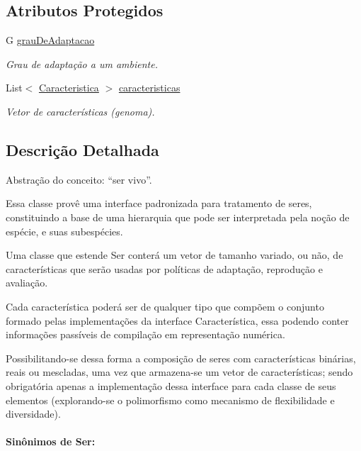 \subsection*{Atributos Protegidos}
\begin{DoxyCompactItemize}
\item 
G \hyperlink{classic_1_1populacional_1_1_ser_3_01_g_01extends_01_number_01_4_aba308e4d1affe1f03d74adb5257d269c}{grau\-De\-Adaptacao}
\begin{DoxyCompactList}\small\item\em Grau de adaptação a um ambiente. \end{DoxyCompactList}\item 
List$<$ \hyperlink{interfaceic_1_1populacional_1_1_caracteristica}{Caracteristica} $>$ \hyperlink{classic_1_1populacional_1_1_ser_3_01_g_01extends_01_number_01_4_a1d2fa894c1d58b8fc3a1aaba3548b873}{caracteristicas}
\begin{DoxyCompactList}\small\item\em Vetor de características (genoma). \end{DoxyCompactList}\end{DoxyCompactItemize}


\subsection{Descrição Detalhada}
Abstração do conceito\-: “ser vivo”. 

Essa classe provê uma interface padronizada para tratamento de seres, constituindo a base de uma hierarquia que pode ser interpretada pela noção de espécie, e suas subespécies. 

Uma classe que estende {\ttfamily Ser} conterá um vetor de tamanho variado, ou não, de características que serão usadas por políticas de adaptação, reprodução e avaliação. 

Cada característica poderá ser de qualquer tipo que compõem o conjunto formado pelas implementações da interface {\ttfamily Característica}, essa podendo conter informações passíveis de compilação em representação numérica. 

Possibilitando-\/se dessa forma a composição de seres com características binárias, reais ou mescladas, uma vez que armazena-\/se um vetor de características; sendo obrigatória apenas a implementação dessa interface para cada classe de seus elementos (explorando-\/se o polimorfismo como mecanismo de flexibilidade e diversidade). 

\paragraph*{Sinônimos de Ser\-: }


